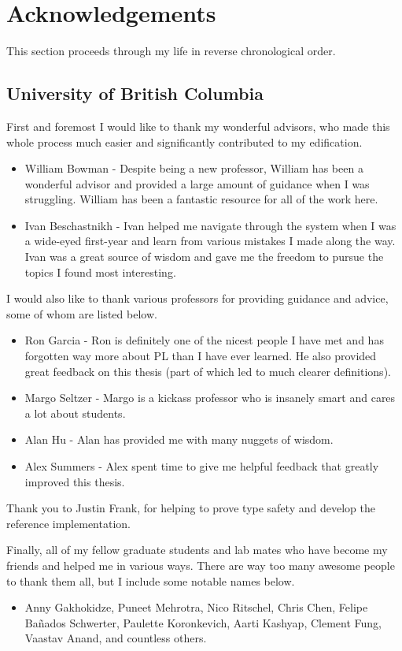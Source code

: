 \chapter{Acknowledgements}
This section proceeds through my life in reverse chronological order.

\section*{University of British Columbia}
First and foremost I would like to thank my wonderful advisors, who made this whole process much easier and significantly contributed to my edification.
\begin{itemize}
    \item William Bowman - Despite being a new professor, William has been a wonderful advisor and provided a large amount of guidance when I was struggling.
    William has been a fantastic resource for all of the work here.
    \item Ivan Beschastnikh - Ivan helped me navigate through the system when I was a wide-eyed first-year and learn from various mistakes I made along the way.
    Ivan was a great source of wisdom and gave me the freedom to pursue the topics I found most interesting.
\end{itemize}

I would also like to thank various professors for providing guidance and advice, some of whom are listed below.
\begin{itemize}
    \item Ron Garcia - Ron is definitely one of the nicest people I have met and has forgotten way more about PL than I have ever learned. He also provided great feedback on this thesis (part of which led to much clearer definitions).
    \item Margo Seltzer - Margo is a kickass professor who is insanely smart and cares a lot about students.
    \item Alan Hu - Alan has provided me with many nuggets of wisdom.
    \item Alex Summers - Alex spent time to give me helpful feedback that greatly improved this thesis.
\end{itemize}

Thank you to Justin Frank, for helping to prove type safety and develop the reference implementation.

Finally, all of my fellow graduate students and lab mates who have become my friends and helped me in various ways. There are way too many awesome people to thank them all, but I include some notable names below.
\begin{itemize}
    \item Anny Gakhokidze, Puneet Mehrotra, Nico Ritschel, Chris Chen, Felipe Ba\~{n}ados Schwerter, Paulette Koronkevich, Aarti Kashyap, Clement Fung, Vaastav Anand, and countless others.
\end{itemize}

